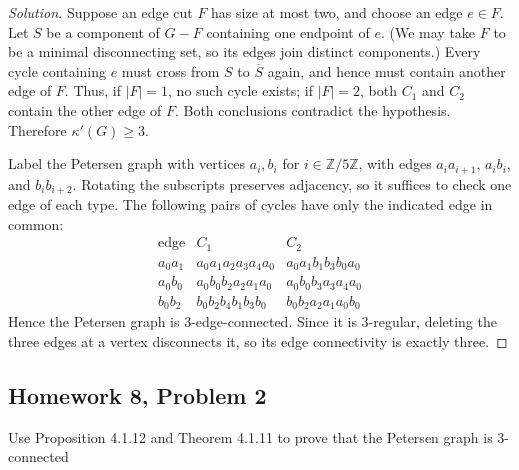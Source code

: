 \documentclass[12pt]{amsart}
\newenvironment{solution}{\begin{proof}[Solution]}{\end{proof}}
\begin{document}
    \begin{solution}

        Suppose an edge cut $F$ has size at most two, and choose an edge
        $e\in F$. Let $S$ be a component of $G-F$ containing one endpoint
        of $e$. (We may take $F$ to be a minimal disconnecting set, so its
        edges join distinct components.) Every cycle containing $e$ must
        cross from $S$ to $\overline S$ again, and hence must contain another
        edge of $F$. Thus, if $|F|=1$, no such cycle exists; if $|F|=2$,
        both $C_1$ and $C_2$ contain the other edge of $F$. Both conclusions
        contradict the hypothesis. Therefore $\kappa'(G)\ge 3$.

        Label the Petersen graph with vertices $a_i,b_i$ for
        $i\in\mathbb Z/5\mathbb Z$, with edges $a_i a_{i+1}$,
        $a_i b_i$, and $b_i b_{i+2}$. Rotating the subscripts preserves
        adjacency, so it suffices to check one edge of each type.
        The following pairs of cycles have only the indicated edge in common:
        \[
            \begin{array}{c|l|l}
                \text{edge}&C_1&C_2\\ \hline
                a_0a_1&a_0a_1a_2a_3a_4a_0&a_0a_1b_1b_3b_0a_0\\
                a_0b_0&a_0b_0b_2a_2a_1a_0&a_0b_0b_3a_3a_4a_0\\
                b_0b_2&b_0b_2b_4b_1b_3b_0&b_0b_2a_2a_1a_0b_0
            \end{array}
        \]
        Hence the Petersen graph is 3-edge-connected. Since it is
        3-regular, deleting the three edges at a vertex disconnects it,
        so its edge connectivity is exactly three.
    \end{solution}

    \subsection*{Homework 8, Problem 2} Use Proposition 4.1.12 and Theorem 4.1.11 to prove that the Petersen graph is
    3-connected
\end{document}

